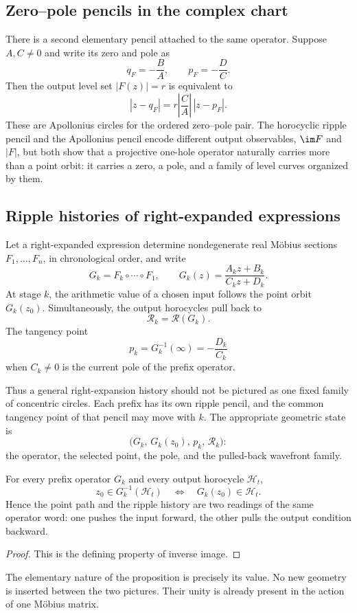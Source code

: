 \subsection{Zero--pole pencils in the complex chart}

There is a second elementary pencil attached to the same operator.  Suppose
$A,C\ne0$ and write its zero and pole as
\[
  q_F=-\frac BA,
  \qquad
  p_F=-\frac DC.
\]
Then the output level set $|F(z)|=r$ is equivalent to
\begin{equation}\label{eq:p0-apollonius-pencil}
  |z-q_F|
  =r\left|\frac CA\right|\,|z-p_F|.
\end{equation}
These are Apollonius circles for the ordered zero--pole pair.  The horocyclic
ripple pencil and the Apollonius pencil encode different output observables,
$\im F$ and $|F|$, but both show that a projective one-hole operator naturally
carries more than a point orbit: it carries a zero, a pole, and a family of
level curves organized by them.

\subsection{Ripple histories of right-expanded expressions}

Let a right-expanded expression determine nondegenerate real M\"obius sections
$F_1,\ldots,F_n$, in chronological order, and write
\[
  G_k=F_k\circ\cdots\circ F_1,
  \qquad
  G_k(z)=\frac{A_kz+B_k}{C_kz+D_k}.
\]
At stage $k$, the arithmetic value of a chosen input follows the point orbit
$G_k(z_0)$.  Simultaneously, the output horocycles pull back to
\[
  \mathcal R_k=\mathcal R(G_k).
\]
The tangency point
\[
  p_k=G_k^{-1}(\infty)
  =-\frac{D_k}{C_k}
\]
when $C_k\ne0$ is the current pole of the prefix operator.

Thus a general right-expansion history should not be pictured as one fixed
family of concentric circles.  Each prefix has its own ripple pencil, and the
common tangency point of that pencil may move with $k$.  The appropriate
geometric state is
\[
  \bigl(G_k,\,G_k(z_0),\,p_k,\,\mathcal R_k\bigr):
\]
the operator, the selected point, the pole, and the pulled-back wavefront
family.

\begin{proposition}
\label{prop:p0-path-ripple-duality}
For every prefix operator $G_k$ and every output horocycle $\mathcal H_t$,
\[
  z_0\in G_k^{-1}(\mathcal H_t)
  \quad\Longleftrightarrow\quad
  G_k(z_0)\in\mathcal H_t.
\]
Hence the point path and the ripple history are two readings of the same
operator word: one pushes the input forward, the other pulls the output
condition backward.
\end{proposition}

\begin{proof}
This is the defining property of inverse image.
\end{proof}

The elementary nature of the proposition is precisely its value.  No new
geometry is inserted between the two pictures.  Their unity is already present
in the action of one M\"obius matrix.
